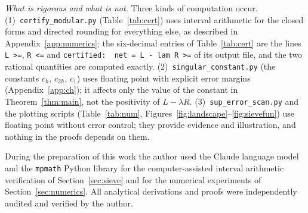 \documentclass[11pt]{amsart}
\theoremstyle{remark}
\begin{document}
{\emph{What is rigorous and what is not.} Three kinds of computation occur. (1)~\texttt{certify\_modular.py} (Table~\ref{tab:cert}) uses interval arithmetic for the closed forms and directed rounding for everything else, as described in Appendix~\ref{app:numerics}; the six-decimal entries of Table~\ref{tab:cert} are the lines \texttt{L >=}, \texttt{R <=} and \texttt{certified:\ \ net = L - lam R >=} of its output file, and the two rational quantities are computed exactly. (2)~\texttt{singular\_constant.py} (the constants $c_h$, $c_{2h}$, $c_1$) uses floating point with explicit error margins (Appendix~\ref{app:ch}); it affects only the value of the constant in Theorem~\ref{thm:main}, not the positivity of $L-\lambda R$. (3)~\texttt{sup\_error\_scan.py} and the plotting scripts (Table~\ref{tab:num}, Figures~\ref{fig:landscape}--\ref{fig:sievefun}) use floating point without error control; they provide evidence and illustration, and nothing in the proofs depends on them.
\par}

\indent During the preparation of this work the author used the Claude language model and the \texttt{mpmath} Python library for the computer-assisted interval arithmetic verification of Section~\ref{sec:sieve} and for the numerical experiments of Section~\ref{sec:numerics}. All analytical derivations and proofs were independently audited and verified by the author.
\end{document}
